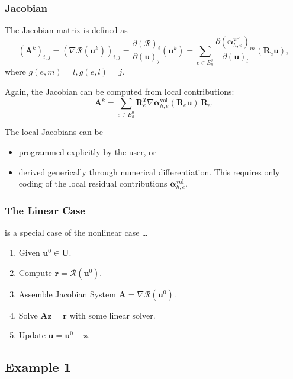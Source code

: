 \begin{frame}
\frametitle{Jacobian}
The Jacobian matrix is defined as
\begin{equation*}
(\mathbf{A}^k)_{i,j} = (\nabla\mathcal{R}(\mathbf{u}^k))_{i,j} 
= \frac{\partial (\mathcal{R})_i}{\partial (\mathbf{u})_j}(\mathbf{u}^k)
= \sum_{e\in E_h^0} \frac{\partial (\bm{\alpha}_{h,e}^{\text{vol}})_m }{\partial (\mathbf{u})_l } (\mathbf{R}_e \mathbf{u}),
\end{equation*}
where $g(e,m)=l, g(e,l)=j$.

Again, the Jacobian can be computed from local contributions:
\begin{equation*}
\mathbf{A}^k = \sum_{e\in E_h^0} \mathbf{R}_e^T \nabla\bm{\alpha}_{h,e}^{\text{vol}}(\mathbf{R}_e \mathbf{u}) \, \mathbf{R}_e.
\end{equation*}

The local Jacobians can be
\begin{itemize}
\item programmed explicitly by the user, or
\item derived generically through numerical differentiation. This requires only coding
of the local residual contributions $\bm{\alpha}_{h,e}^{\text{vol}}$.
\end{itemize}
\end{frame}


\begin{frame}
\frametitle{The Linear Case}
is a special case of the nonlinear case \ldots
\begin{enumerate}
\item Given $\mathbf{u}^0\in\mathbf{U}$.
\item Compute $\mathbf{r} = \mathcal{R}(\mathbf{u}^0)$.
\item Assemble Jacobian System $\mathbf{A} = \nabla\mathcal{R}(\mathbf{u}^0)$.
\item Solve $\mathbf{A} \mathbf{z} = \mathbf{r}$ with some linear solver.
\item Update $\mathbf{u} = \mathbf{u}^{0} - \mathbf{z}$.
\end{enumerate}
\end{frame}

\subsection{Example 1}

